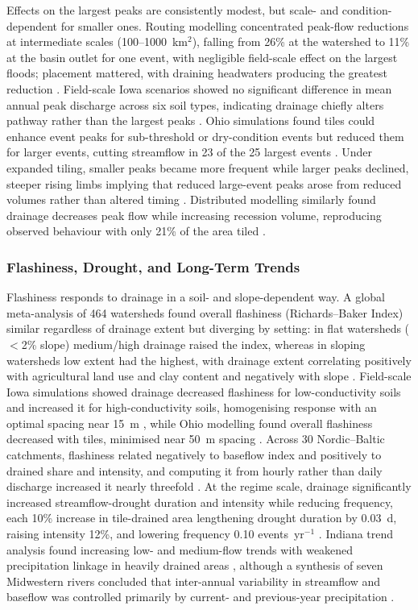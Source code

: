 Effects on the largest peaks are consistently modest, but scale- and condition-dependent for smaller ones. Routing modelling concentrated peak-flow reductions at intermediate scales (100--1000~km$^2$), falling from 26\% at the watershed to 11\% at the basin outlet for one event, with negligible field-scale effect on the largest floods; placement mattered, with draining headwaters producing the greatest reduction \parencite{Sloan2017}. Field-scale Iowa scenarios showed no significant difference in mean annual peak discharge across six soil types, indicating drainage chiefly alters pathway rather than the largest peaks \parencite{Sloan2016}. Ohio simulations found tiles could enhance event peaks for sub-threshold or dry-condition events but reduced them for larger events, cutting streamflow in 23 of the 25 largest events \parencite{Rathore2025}. Under expanded tiling, smaller peaks became more frequent while larger peaks declined, steeper rising limbs implying that reduced large-event peaks arose from reduced volumes rather than altered timing \parencite{Rahman2014}. Distributed modelling similarly found drainage decreases peak flow while increasing recession volume, reproducing observed behaviour with only 21\% of the area tiled \parencite{Fonley2021}.

\subsubsection{Flashiness, Drought, and Long-Term Trends}

Flashiness responds to drainage in a soil- and slope-dependent way. A global meta-analysis of 464 watersheds found overall flashiness (Richards--Baker Index) similar regardless of drainage extent but diverging by setting: in flat watersheds ($<$2\% slope) medium/high drainage raised the index, whereas in sloping watersheds low extent had the highest, with drainage extent correlating positively with agricultural land use and clay content and negatively with slope \parencite{Zhou2025}. Field-scale Iowa simulations showed drainage decreased flashiness for low-conductivity soils and increased it for high-conductivity soils, homogenising response with an optimal spacing near 15~m \parencite{Sloan2016}, while Ohio modelling found overall flashiness decreased with tiles, minimised near 50~m spacing \parencite{Rathore2025}. Across 30 Nordic--Baltic catchments, flashiness related negatively to baseflow index and positively to drained share and intensity, and computing it from hourly rather than daily discharge increased it nearly threefold \parencite{Deelstra2014,Deelstra2014b}. At the regime scale, drainage significantly increased streamflow-drought duration and intensity while reducing frequency, each 10\% increase in tile-drained area lengthening drought duration by 0.03~d, raising intensity 12\%, and lowering frequency 0.10 events~yr$^{-1}$ \parencite{Adelsperger2024}. Indiana trend analysis found increasing low- and medium-flow trends with weakened precipitation linkage in heavily drained areas \parencite{Kumar2009}, although a synthesis of seven Midwestern rivers concluded that inter-annual variability in streamflow and baseflow was controlled primarily by current- and previous-year precipitation \parencite{Baeumler2020}.


